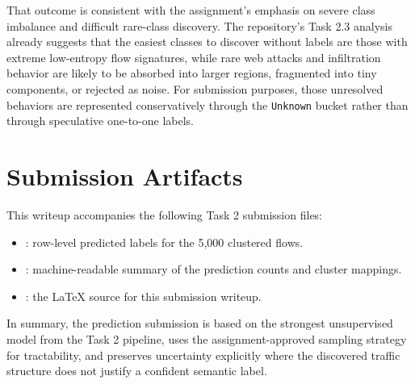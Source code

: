 \documentclass[journal,onecolumn]{IEEEtran}
\begin{document}
That outcome is consistent with the assignment's emphasis on severe class imbalance and difficult rare-class discovery. The repository's Task 2.3 analysis already suggests that the easiest classes to discover without labels are those with extreme low-entropy flow signatures, while rare web attacks and infiltration behavior are likely to be absorbed into larger regions, fragmented into tiny components, or rejected as noise. For submission purposes, those unresolved behaviors are represented conservatively through the \texttt{Unknown} bucket rather than through speculative one-to-one labels.

\section{Submission Artifacts}
This writeup accompanies the following Task 2 submission files:

\begin{itemize}
\item {}: row-level predicted labels for the 5,000 clustered flows.
\item {}: machine-readable summary of the prediction counts and cluster mappings.
\item {}: the LaTeX source for this submission writeup.
\end{itemize}

In summary, the prediction submission is based on the strongest unsupervised model from the Task 2 pipeline, uses the assignment-approved sampling strategy for tractability, and preserves uncertainty explicitly where the discovered traffic structure does not justify a confident semantic label.
\end{document}
